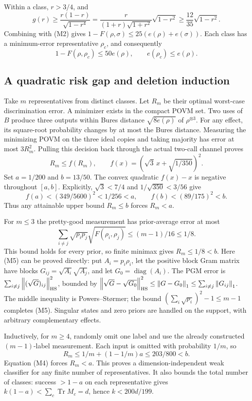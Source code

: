 \documentclass[11pt]{article}
\newcommand{\Tr}{\operatorname{Tr}}
\newcommand{\norm}[1]{\left\lVert#1\right\rVert}
\begin{document}
Within a class, $r>3/4$, and
\[
g(r)\ge\frac{r(1-r)}{\sqrt{1-r^4}}
=\frac{r}{(1+r)\sqrt{1+r^2}}\sqrt{1-r^2}
\ge\frac{12}{35}\sqrt{1-r^2}.
\]
Combining with (M2) gives $1-F(\rho,\sigma)\le25(e(\rho)+e(\sigma))$. Each class has a minimum-error representative $\rho_c$, and consequently
\[
1-F(\rho,\rho_c)\le50e(\rho),\qquad e(\rho_c)\le e(\rho).
\tag{M3}
\]

\subsection{A quadratic risk gap and deletion induction}

Take $m$ representatives from distinct classes. Let $R_m$ be their optimal worst-case discrimination error. A minimizer exists in the compact POVM set. Two uses of $B$ produce three outputs within Bures distance $\sqrt{8e(\rho)}$ of $\rho^{\otimes3}$. For any effect, its square-root probability changes by at most the Bures distance. Measuring the minimizing POVM on the three ideal copies and taking majority has error at most $3R_m^2$. Pulling this decision back through the actual two-call channel proves
\[
R_m\le f(R_m),\qquad f(x)=(\sqrt3\,x+\sqrt{1/350})^2.
\tag{M4}
\]
Set $a=1/200$ and $b=13/50$. The convex quadratic $f(x)-x$ is negative throughout $[a,b]$. Explicitly, $\sqrt3<7/4$ and $1/\sqrt{350}<3/56$ give
\[
f(a)<(349/5600)^2<1/256<a,\qquad
f(b)<(89/175)^2<b.
\]
Thus any attainable upper bound $R_m\le b$ forces $R_m<a$.

For $m\le3$ the pretty-good measurement has prior-average error at most
\[
\sum_{i\ne j}\sqrt{p_ip_j}\sqrt{F(\rho_i,\rho_j)}
\le(m-1)/16\le1/8.
\tag{M5}
\]
This bound holds for every prior, so finite minimax gives $R_m\le1/8<b$. Here (M5) can be proved directly: put $A_i=p_i\rho_i$, let the positive block Gram matrix have blocks $G_{ij}=\sqrt{A_i}\sqrt{A_j}$, and let $G_0=\operatorname{diag}(A_i)$. The PGM error is $\sum_{i\ne j}\norm{(\sqrt G)_{ij}}_{\rm HS}^2$, bounded by $\norm{\sqrt G-\sqrt{G_0}}_{\rm HS}^2\le\norm{G-G_0}_1\le\sum_{i\ne j}\norm{G_{ij}}_1$. The middle inequality is Powers--St\o rmer; the bound $(\sum_i\sqrt{p_i})^2-1\le m-1$ completes (M5). Singular states and zero priors are handled on the support, with arbitrary complementary effects.

Inductively, for $m\ge4$, randomly omit one label and use the already constructed $(m-1)$-label measurement. Each input is omitted with probability $1/m$, so
\[
R_m\le1/m+(1-1/m)a\le203/800<b.
\tag{M6}
\]
Equation (M4) forces $R_m<a$. This proves a dimension-independent weak classifier for any finite number of representatives. It also bounds the total number of classes: success $>1-a$ on each representative gives $k(1-a)<\sum_c\Tr M_c=d$, hence $k<200d/199$.
\end{document}
